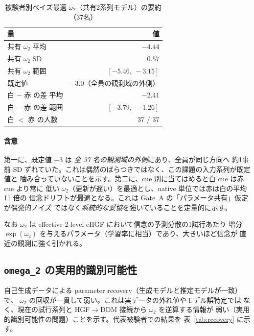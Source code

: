 \documentclass[11pt]{ltjsarticle}
\newcommand{\code}[1]{\texttt{#1}}
\begin{document}
\begin{table}[htbp]
\centering
\caption{被験者別ベイズ最適 \(\omega_2\)（共有2系列モデル）の要約（37名）}
\label{tab:bo}
\begin{tabular}{lr}
\toprule
量 & 値 \\
\midrule
共有 \(\omega_2\) 平均 & \(-4.44\) \\
共有 \(\omega_2\) SD & \(0.57\) \\
共有 \(\omega_2\) 範囲 & \([-5.46,\ -3.15]\) \\
既定値 & \(-3.0\)（全員の観測域の外側）\\
\midrule
白 \(-\) 赤 の差 平均 & \(-2.41\) \\
白 \(-\) 赤 の差 範囲 & \([-3.79,\ -1.26]\) \\
白 \(<\) 赤 の人数 & 37 / 37 \\
\bottomrule
\end{tabular}
\end{table}

\paragraph{含意}
第一に、既定値 \(-3\) は \emph{全 37 名の観測域の外側}にあり、全員が同じ方向へ
約1事前 SD ずれていた。これは偶然のばらつきではなく、この課題の入力系列が既定値と
噛み合っていないことを示す。第二に、cue 別に当てはめると白 cue は赤 cue より常に
低い \(\omega_2\)（更新が遅い）を最適とし、native 単位では赤は白の平均 11 倍の
信念ドリフトが最適となる。これは Gate~A の「パラメータ共有」仮定が偶発的ノイズ
ではなく\emph{系統的な妥協}を強いていることを定量的に示す。

なお \(\omega_2\) は effective 2-level eHGF において信念の予測分散の1試行あたり
増分 \(\exp(\omega_2)\) を与えるパラメータ（学習率に相当）であり、大きいほど信念が
直近の観測に強く引かれる。

\subsection{\code{omega\_2} の実用的識別可能性}
\label{sec:identifiability}

自己生成データによる parameter recovery（生成モデルと推定モデルが一致）で、
\(\omega_2\) の回収が一貫して弱い。これは実データの外れ値やモデル誤特定では
なく、現在の試行系列と HGF\(\to\)DDM 接続から \(\omega_2\) を逆算する情報が
弱い（実用的識別可能性の問題）ことを示す。代表被験者での結果を
表~\ref{tab:recovery} に示す。
\end{document}
